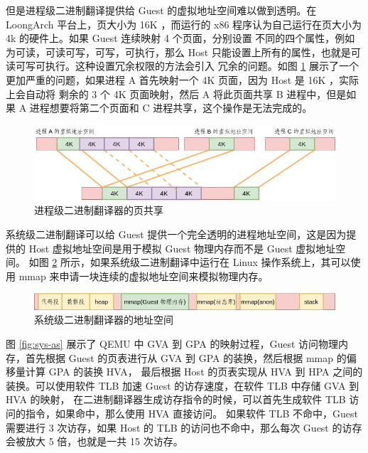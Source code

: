 但是进程级二进制翻译提供给 Guest 的虚拟地址空间难以做到透明。在 LoongArch 平台上，页大小为 16K ，而运行的 x86 程序认为自己运行在页大小为 4k 的硬件上。如果 Guest 连续映射 4 个页面，分别设置
不同的四个属性，例如为可读，可读可写，可写，可执行，那么 Host 只能设置上所有的属性，也就是可读可写可执行。这种设置冗余权限的方法会引入
冗余的问题。如图 \ref{fig:16k} 展示了一个更加严重的问题，如果进程 A 首先映射一个 4K 页面，因为 Host 是 16K ，实际上会自动将
剩余的 3 个 4K 页面映射，然后 A 将此页面共享 B 进程中，但是如果 A 进程想要将第二个页面和 C 进程共享，这个操作是无法完成的。

\begin{figure}[!htbp]
	\centering
	\includegraphics[width=1.0\textwidth]{./images/16k.jpg}
	\caption{进程级二进制翻译器的页共享}
	\label{fig:16k}
\end{figure}

系统级二进制翻译可以给 Guest 提供一个完全透明的进程地址空间，这是因为提供的 Host 虚拟地址空间是用于模拟 Guest 物理内存而不是 Guest 虚拟地址空间。
如图 \ref{fig:sys-as2} 所示，如果系统级二进制翻译中运行在 Linux 操作系统上，其可以使用 mmap 来申请一块连续的虚拟地址空间来模拟物理内存。

\begin{figure}[!htbp]
	\centering
	\includegraphics[width=1.0\textwidth]{./images/sys-as2.jpg}
	\caption{系统级二进制翻译器的地址空间}
	\label{fig:sys-as2}
\end{figure}

图 \ref{fig:sys-as} 展示了 QEMU 中 GVA 到 GPA 的映射过程，Guest 访问物理内存，首先根据 Guest 的页表进行从 GVA 到 GPA 的装换，然后根据 mmap 的偏移量计算 GPA 的装换 HVA，
最后根据 Host 的页表实现从 HVA 到 HPA 之间的装换。可以使用软件 TLB 加速 Guest 的访存速度，在软件 TLB 中存储 GVA 到 HVA 的映射，
在二进制翻译器生成访存指令的时候，可以首先生成软件 TLB 访问的指令，如果命中，那么使用 HVA 直接访问。
如果软件 TLB 不命中，Guest 需要进行 3 次访存，如果 Host 的 TLB 的访问也不命中，那么每次 Guest 的访存会被放大 5 倍，也就是一共 15 次访存。

